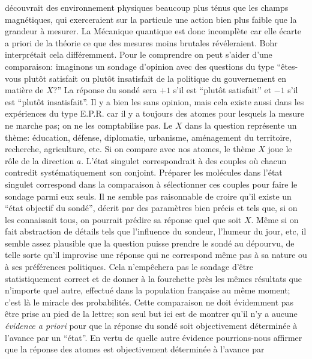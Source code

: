 d\'ecouvrait des environnement physiques beaucoup plus t\'enus que les 
champs magn\'etiques, qui exerceraient sur la particule une action bien 
plus faible que la grandeur \`a mesurer. La M\'ecanique quantique est 
donc incompl\`ete car elle \'ecarte a priori de la th\'eorie  ce que des 
mesures moins brutales r\'ev\'eleraient.    
\medskip  
Bohr interpr\'etait cela diff\'eremment. Pour le comprendre on peut 
s'aider d'une comparaison: imaginons un sondage d'opinion avec des
questions du type ``\^etes-vous plut\^ot satisfait ou plut\^ot insatisfait
de la politique du gouvernement en mati\`ere de $X$?'' La r\'eponse du
sond\'e sera $+1$ s'il est ``plut\^ot satisfait'' et $-1$ s'il est ``plut\^ot
insatisfait''. Il y a bien les  sans opinion, mais cela existe aussi dans les
exp\'eriences du type E.P.R. car il y a toujours des atomes pour lesquels 
la mesure ne marche pas; on ne les comptabilise pas. Le $X$ dans la
question repr\'esente un th\`eme: \'education, d\'efense, diplomatie,
urbanisme, am\'enagement du territoire, recherche, agriculture, etc. Si 
on compare avec nos atomes, le th\`eme  $X$ joue le r\^ole de la direction
$a$. L'\'etat singulet correspondrait \`a  des couples o\`u chacun contredit
syst\'ematiquement son conjoint. Pr\'eparer les mol\'ecules dans l'\'etat
singulet correspond dans la comparaison \`a  s\'electionner ces couples
pour faire le sondage parmi eux seuls. Il ne semble  pas raisonnable de
croire qu'il existe  un ``\'etat objectif du sond\'e'', d\'ecrit par des
param\`etres bien pr\'ecis et tels que, si on les connaissait tous, on
pourrait pr\'edire sa r\'eponse quel que soit $X$. M\^eme si on fait
abstraction de d\'etails tels que l'influence du sondeur, l'humeur du jour,
etc, il semble assez plausible  que la question puisse prendre le sond\'e
au d\'epourvu, de telle sorte  qu'il improvise une r\'eponse qui  ne
correspond m\^eme pas \`a sa nature ou \`a ses pr\'ef\'erences politiques.
Cela n'emp\^echera pas le sondage d'\^etre statistiquement correct et de 
donner \`a la fourchette pr\`es   les m\^emes r\'esultats que n'importe
quel autre, effectu\'e dans la population fran\c{c}aise au m\^eme moment;
c'est l\`a le miracle des probabilit\'es. Cette comparaison ne doit
\'evidemment pas \^etre prise  au pied de la  lettre; son seul but ici est  
de montrer qu'il n'y a aucune {\it \'evidence a priori} pour que la r\'eponse
du sond\'e soit objectivement d\'etermin\'ee \`a l'avance par un ``\'etat''.
En vertu de quelle autre \'evidence pourrions-nous affirmer que la
r\'eponse des atomes  est objectivement  d\'etermin\'ee \`a l'avance par
